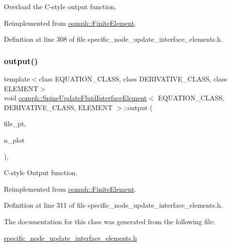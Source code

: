Overload the C-\/style output function. 



Reimplemented from \hyperlink{classoomph_1_1FiniteElement_a72cddd09f8ddbee1a20a1ff404c6943e}{oomph\+::\+Finite\+Element}.



Definition at line 308 of file specific\+\_\+node\+\_\+update\+\_\+interface\+\_\+elements.\+h.

\mbox{\label{classoomph_1_1SpineUpdateFluidInterfaceElement_af876d90d19b6faa253260193ded3f175}} 
\subsubsection{\texorpdfstring{output()}{output()}\hspace{0.1cm}{\footnotesize\ttfamily [4/4]}}
{\footnotesize\ttfamily template$<$class E\+Q\+U\+A\+T\+I\+O\+N\+\_\+\+C\+L\+A\+SS, class D\+E\+R\+I\+V\+A\+T\+I\+V\+E\+\_\+\+C\+L\+A\+SS, class E\+L\+E\+M\+E\+NT$>$ \\
void \hyperlink{classoomph_1_1SpineUpdateFluidInterfaceElement}{oomph\+::\+Spine\+Update\+Fluid\+Interface\+Element}$<$ E\+Q\+U\+A\+T\+I\+O\+N\+\_\+\+C\+L\+A\+SS, D\+E\+R\+I\+V\+A\+T\+I\+V\+E\+\_\+\+C\+L\+A\+SS, E\+L\+E\+M\+E\+NT $>$\+::output (\begin{DoxyParamCaption}\item[{F\+I\+LE $\ast$}]{file\+\_\+pt,  }\item[{const unsigned \&}]{n\+\_\+plot }\end{DoxyParamCaption})\hspace{0.3cm}{\ttfamily [inline]}, {\ttfamily [virtual]}}



C-\/style Output function. 



Reimplemented from \hyperlink{classoomph_1_1FiniteElement_adfaee690bb0608f03320eeb9d110d48c}{oomph\+::\+Finite\+Element}.



Definition at line 311 of file specific\+\_\+node\+\_\+update\+\_\+interface\+\_\+elements.\+h.



The documentation for this class was generated from the following file\+:\begin{DoxyCompactItemize}
\item 
\hyperlink{specific__node__update__interface__elements_8h}{specific\+\_\+node\+\_\+update\+\_\+interface\+\_\+elements.\+h}\end{DoxyCompactItemize}
